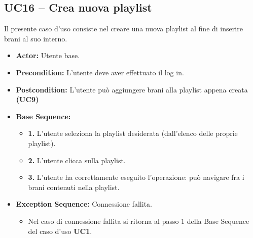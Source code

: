 \subsection{UC16 -- Crea nuova playlist}
Il presente caso d'uso consiste nel creare una nuova playlist al fine di inserire brani al suo interno.
\begin{itemize}
    \item \textbf{Actor:} Utente base.
    \item \textbf{Precondition:} L'utente deve aver effettuato il log in.
    \item \textbf{Postcondition:} L'utente può aggiungere brani alla playlist appena creata \textbf{(UC9)}
    \item \textbf{Base Sequence:}
    \begin{itemize}
        \item \textbf{1.} L'utente seleziona la playlist desiderata (dall'elenco delle proprie playlist).
        \item \textbf{2.} L'utente clicca sulla playlist.
        \item \textbf{3.} L'utente ha correttamente eseguito l'operazione: può navigare fra i brani contenuti nella playlist.
    \end{itemize}
    \item \textbf{Exception Sequence:} Connessione fallita.
    \begin{itemize}
        \item Nel caso di connessione fallita si ritorna al passo 1 della Base Sequence del caso d'uso \textbf{UC1}.
    \end{itemize}
\end{itemize}
\vspace{1cm}

